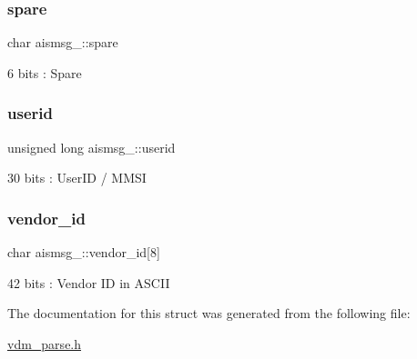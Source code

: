 \subsubsection{\texorpdfstring{spare}{spare}}
{\footnotesize\ttfamily char aismsg\+\_\+::spare}



6 bits \+: Spare 

\mbox{\label{structaismsg__24_a8eabfc1e4a4372e492f82e871cd2f870}} 
\subsubsection{\texorpdfstring{userid}{userid}}
{\footnotesize\ttfamily unsigned long aismsg\+\_\+::userid}



30 bits \+: User\+ID / M\+M\+SI 

\mbox{\label{structaismsg__24_af54a6f8e63bb033a2f1189f75a6d7f32}} 
\subsubsection{\texorpdfstring{vendor\+\_\+id}{vendor\_id}}
{\footnotesize\ttfamily char aismsg\+\_\+::vendor\+\_\+id\mbox{[}8\mbox{]}}



42 bits \+: Vendor ID in A\+S\+C\+II 



The documentation for this struct was generated from the following file\+:\begin{DoxyCompactItemize}
\item 
\mbox{\hyperlink{vdm__parse_8h}{vdm\+\_\+parse.\+h}}\end{DoxyCompactItemize}

